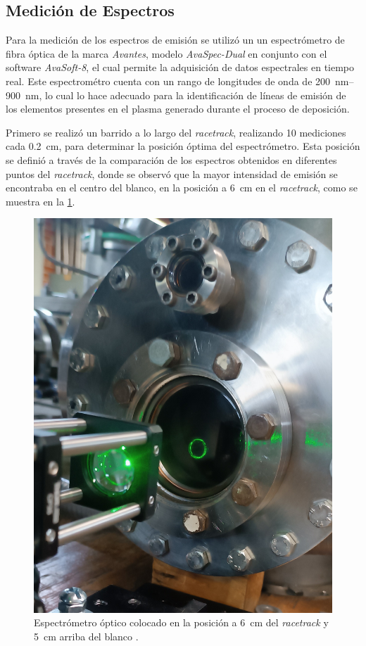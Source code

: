 \documentclass[12pt]{IEEEtran}
\begin{document}
\subsection{Medición de Espectros}

Para la medición de los espectros de emisión se utilizó un un espectrómetro de fibra óptica
de la marca \emph{Avantes}, modelo \emph{AvaSpec-Dual} en conjunto con el software
\emph{AvaSoft-8}, el cual permite la adquisición de datos espectrales en tiempo real.
Este espectrométro cuenta con un rango de longitudes de onda de \qtyrange{200}{900}{\nm},
lo cual lo hace adecuado para la identificación de líneas de emisión
de los elementos presentes en el plasma generado durante el proceso de deposición.

\par
Primero se realizó un barrido a lo largo del \emph{racetrack}, realizando 10 mediciones
cada \qty{.2}{\cm}, para determinar la posición óptima del espectrómetro.
Esta posición se definió a través de la comparación de los espectros
obtenidos en diferentes puntos del \emph{racetrack},
donde se observó que la mayor intensidad de emisión se encontraba en el centro del blanco,
en la posición a \qty{6}{\cm} en el \emph{racetrack}, como se muestra en la \cref{fig:espectrometro}.

\begin{figure}[htb]
	\centering
	\includegraphics[width=.8\linewidth]{espectrometro-measures.jpg}
	\caption{Espectrómetro óptico colocado en la posición a \qty{6}{\cm} del \emph{racetrack} y \qty{5}{\cm} arriba del blanco .}
	\label{fig:espectrometro}
\end{figure}
\end{document}
